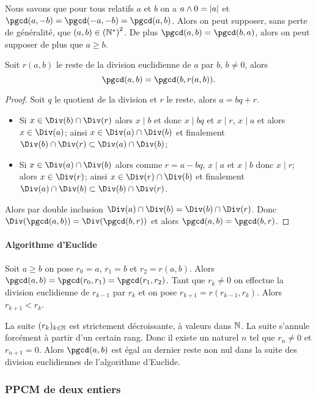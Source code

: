 Nous savons que pour tous relatifs $a$ et $b$ on a $a \wedge 0 = \left\lvert a\right\rvert$ et $\pgcd(a,-b) = \pgcd(-a,-b) = \pgcd(a,b)$. Alors on peut supposer, sans perte de généralité, que $(a,b) \in \left(\mathbb{N}^{*}\right)^{2}$. De plus $\pgcd(a,b) =\pgcd(b,a)$, alors on peut supposer de plus que $a \geq b$.

\begin{lemme}
  Soit $r(a,b)$ le reste de la division euclidienne de $a$ par $b$, $b \neq 0$, alors
  \begin{equation}
    \pgcd(a,b) = \pgcd(b,r(a,b)).
  \end{equation}
\end{lemme}
\begin{proof}
  Soit $q$ le quotient de la division et $r$ le reste, alors $a=bq+r$.
  \begin{itemize}
  \item Si $x \in \Div(b) \cap \Div(r)$ alors $x \mid b$ et donc $x \mid bq$ et $x \mid r$, $x \mid a$ et alors $x \in \Div(a)$; ainsi $x \in \Div(a) \cap \Div(b)$ et finalement $\Div(b) \cap \Div(r) \subset \Div(a) \cap \Div(b)$;
  \item Si $x \in \Div(a) \cap \Div(b)$ alors comme $r=a-bq$, $x \mid a$ et $x \mid b$ donc $x \mid r$; alors $x \in \Div(r)$; ainsi $x \in \Div(r) \cap \Div(b)$ et finalement $\Div(a) \cap \Div(b) \subset \Div(b) \cap \Div(r)$.
  \end{itemize}
  Alors par double inclusion $\Div(a) \cap \Div(b)= \Div(b) \cap \Div(r)$. Donc $\Div(\pgcd(a,b)) = \Div(\pgcd(b,r))$ et alors $\pgcd(a,b) = \pgcd(b,r)$.
\end{proof}

\paragraph{Algorithme d'Euclide}

Soit $a \geq b$ on pose $r_0=a$, $r_1=b$ et $r_2=r(a,b)$. Alors $\pgcd(a,b) = \pgcd(r_0, r_1) = \pgcd(r_1,r_2)$. Tant que $r_k \neq 0$ on effectue la division euclidienne de $r_{k-1}$ par $r_k$ et on pose $r_{k+1}=r(r_{k-1},r_k)$. Alors $r_{k+1} < r_k$.

La suite $(r_k)_{k \in \mathbb{N}}$ est strictement décroissante, à valeurs dans $\mathbb{N}$. La suite s'annule forcément à partir d'un certain rang. Donc il existe un naturel $n$ tel que $r_n \neq 0$ et $r_{n+1}=0$. Alors $\pgcd(a,b)$ est égal au dernier reste non nul dans la suite des division euclidiennes de l'algorithme d'Euclide.

\subsubsection{PPCM de deux entiers}

